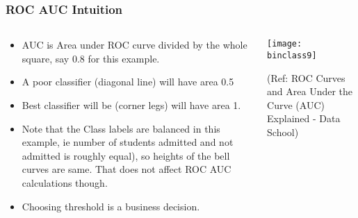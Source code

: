 \begin{frame}[fragile]\frametitle{ROC AUC Intuition}

\begin{columns}
\begin{column}[T]{0.5\linewidth}
\begin{itemize}
\item AUC is Area under ROC curve divided by the whole square, say 0.8 for this example.
\item A poor classifier (diagonal line) will have area 0.5
\item Best classifier will be (corner legs) will have area 1.
\item Note that the Class labels are balanced in this example, ie number of students admitted and not admitted is roughly equal), so heights of the bell curves are same. That does not affect ROC AUC calculations though.
\item Choosing threshold is a business decision.
\end{itemize}
\end{column}
\begin{column}[T]{0.5\linewidth}

\begin{center}
\texttt{[image: binclass9]}
\end{center}

\tiny{(Ref: ROC Curves and Area Under the Curve (AUC) Explained - Data School)}
\end{column}

\end{columns}
\end{frame}





